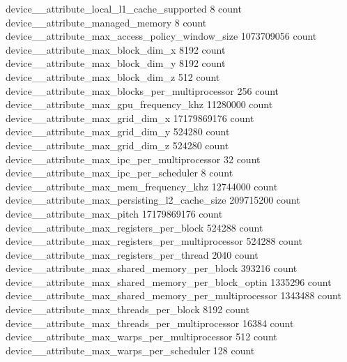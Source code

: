device__attribute_local_l1_cache_supported                                                     8 count
device__attribute_managed_memory                                                               8 count
device__attribute_max_access_policy_window_size                                       1073709056 count
device__attribute_max_block_dim_x                                                           8192 count
device__attribute_max_block_dim_y                                                           8192 count
device__attribute_max_block_dim_z                                                            512 count
device__attribute_max_blocks_per_multiprocessor                                              256 count
device__attribute_max_gpu_frequency_khz                                                 11280000 count
device__attribute_max_grid_dim_x                                                     17179869176 count
device__attribute_max_grid_dim_y                                                          524280 count
device__attribute_max_grid_dim_z                                                          524280 count
device__attribute_max_ipc_per_multiprocessor                                                  32 count
device__attribute_max_ipc_per_scheduler                                                        8 count
device__attribute_max_mem_frequency_khz                                                 12744000 count
device__attribute_max_persisting_l2_cache_size                                         209715200 count
device__attribute_max_pitch                                                          17179869176 count
device__attribute_max_registers_per_block                                                 524288 count
device__attribute_max_registers_per_multiprocessor                                        524288 count
device__attribute_max_registers_per_thread                                                  2040 count
device__attribute_max_shared_memory_per_block                                             393216 count
device__attribute_max_shared_memory_per_block_optin                                      1335296 count
device__attribute_max_shared_memory_per_multiprocessor                                   1343488 count
device__attribute_max_threads_per_block                                                     8192 count
device__attribute_max_threads_per_multiprocessor                                           16384 count
device__attribute_max_warps_per_multiprocessor                                               512 count
device__attribute_max_warps_per_scheduler                                                    128 count
